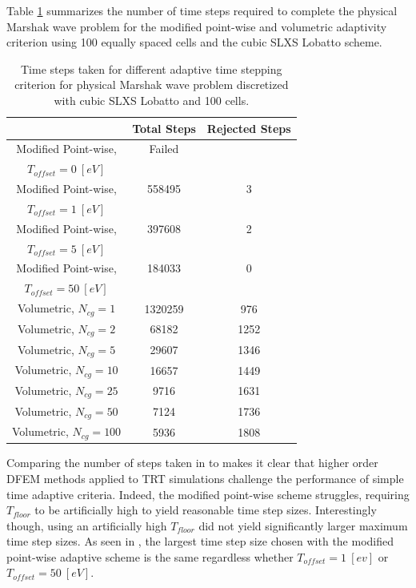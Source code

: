 Table \ref{tbl:p3_counts} summarizes the number of time steps required to complete the physical Marshak wave problem for the modified point-wise and volumetric adaptivity criterion using 100 equally spaced cells and the cubic SLXS Lobatto scheme.
\begin{table}[!htp]
\centering
\caption{Time steps taken for different adaptive time stepping criterion for physical Marshak wave problem discretized with cubic SLXS Lobatto and 100 cells.}
\label{tbl:p3_counts}
\begin{tabular}{|c|c|c|}
\hline
{} &  Total Steps & Rejected Steps \\
\hline
Modified Point-wise, &   Failed & \\
$T_{offset} = 0~[eV]$ &    &   \\
\hline
Modified Point-wise, &   558495  & 3 \\
$T_{offset} = 1~[eV]$ &     &  \\
\hline
Modified Point-wise, &  397608  & 2\\
$T_{offset} = 5~[eV]$ &    &  \\
\hline
Modified Point-wise, &  184033  & 0\\
$T_{offset} = 50~[eV]$ &    &  \\
\hline
Volumetric, $N_{cg} = 1$ &  1320259  & 976 \\
\hline
Volumetric, $N_{cg} = 2$ & 68182   & 1252 \\
\hline
Volumetric, $N_{cg} = 5$ & 29607   & 1346 \\
\hline
Volumetric, $N_{cg} = 10$ & 16657   & 1449 \\
\hline
Volumetric, $N_{cg} = 25$ & 9716   & 1631 \\
\hline
Volumetric, $N_{cg} = 50$ & 7124   & 1736 \\
\hline
Volumetric, $N_{cg} = 100$ & 5936   & 1808 \\
\hline
\end{tabular}
\end{table}
Comparing the number of steps taken in  to  makes it clear that higher order DFEM methods applied to TRT simulations challenge the performance of simple time adaptive criteria.
Indeed, the modified point-wise scheme struggles, requiring $T_{floor}$ to be artificially high to yield reasonable time step sizes.
Interestingly though, using an artificially high $T_{floor}$ did not yield significantly larger maximum time step sizes.  
As seen in , the largest time step size chosen with the modified point-wise adaptive scheme is the same regardless whether $T_{offset} = 1~[ev]$ or $T_{offset} = 50~[eV]$.
